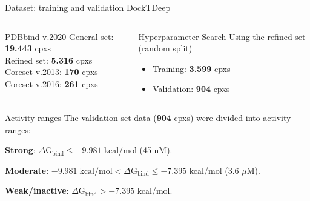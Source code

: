 \documentclass[aspectratio=169,xcolor=dvipsnames]{beamer}
\begin{document}
\begin{frame}{Dataset: training and validation \hfill {\footnotesize \alert{DockTDeep}}}
    \begin{columns}[t]
        \begin{block}{PDBbind v.2020}
            General set: \textbf{19.443} cpxs \\
            Refined set: \textbf{5.316} cpxs \\
            Coreset v.2013: \textbf{170} cpxs \\
            Coreset v.2016: \textbf{261} cpxs \\
        \end{block}

        \begin{block}{Hyperparameter Search}
            Using the refined set (random split)
            \begin{itemize}
                \item Training: \textbf{3.599} cpxs
                \item Validation: \textbf{904} cpxs
            \end{itemize}
        \end{block}


    \end{columns}

    \begin{block}{Activity ranges}
        The validation set data (\textbf{904} cpxs) were divided into activity ranges:
        \item \textbf{Strong}: $\Delta \text{G}_{\text{bind}} \leq -9.981$ kcal/mol (45 nM).
        \item \textbf{Moderate}: $-9.981 \; \text{kcal/mol} < \Delta \text{G}_{\text{bind}} \leq  -7.395$ kcal/mol (3.6 $\mu$M).
        \item \textbf{Weak/inactive}: $\Delta \text{G}_{\text{bind}} > -7.395$ kcal/mol.
    \end{block}
\end{frame}
\end{document}
